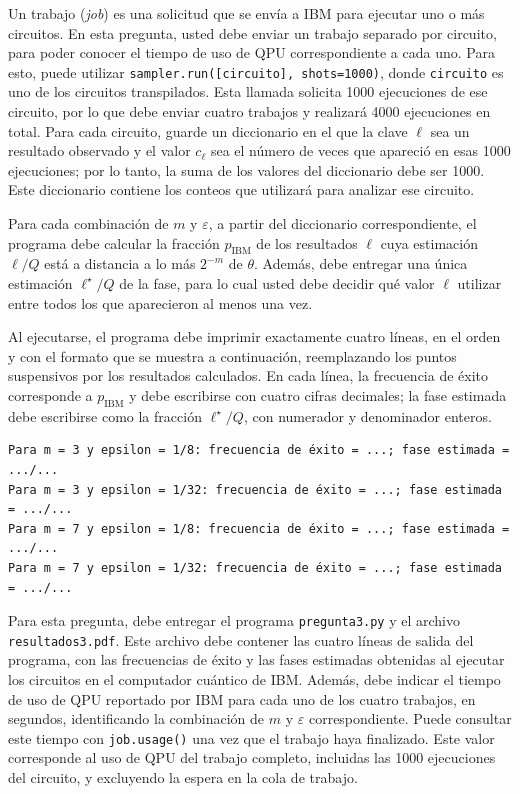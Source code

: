 \documentclass[10pt]{article}
\begin{document}
\begin{enumerate}
  Un trabajo (\emph{job}) es una solicitud que se envía a IBM para ejecutar uno o más
  circuitos. En esta pregunta, usted debe enviar un trabajo separado por circuito,
  para poder conocer el tiempo de uso de QPU correspondiente a cada uno. Para esto,
  puede utilizar \texttt{sampler.run([circuito], shots=1000)}, donde \texttt{circuito}
  es uno de los circuitos transpilados. Esta llamada solicita 1000 ejecuciones de ese
  circuito, por lo que debe enviar cuatro trabajos y realizará 4000 ejecuciones en total.
  Para cada circuito, guarde un diccionario en el que la clave $\ell$ sea un resultado
  observado y el valor $c_\ell$ sea el número de veces que apareció en esas 1000
  ejecuciones; por lo tanto, la suma de los valores del diccionario debe ser 1000.
  Este diccionario contiene los conteos que utilizará para analizar ese circuito.

  Para cada combinación de $m$ y $\varepsilon$, a partir del diccionario correspondiente,
  el programa debe calcular la fracción $p_{\mathrm{IBM}}$ de los resultados $\ell$
  cuya estimación $\ell/Q$ está a distancia a lo más $2^{-m}$ de $\theta$. Además,
  debe entregar una única estimación $\ell^\star/Q$ de la fase, para lo cual usted
  debe decidir qué valor $\ell$ utilizar entre todos los que aparecieron al menos una vez.

  Al ejecutarse, el programa debe imprimir exactamente cuatro líneas, en el orden y
  con el formato que se muestra a continuación, reemplazando los puntos suspensivos
  por los resultados calculados. En cada línea, la frecuencia de éxito corresponde
  a $p_{\mathrm{IBM}}$ y debe escribirse con cuatro cifras decimales; la fase estimada
  debe escribirse como la fracción $\ell^\star/Q$, con numerador y denominador enteros.

\begin{verbatim}
Para m = 3 y epsilon = 1/8: frecuencia de éxito = ...; fase estimada = .../...
Para m = 3 y epsilon = 1/32: frecuencia de éxito = ...; fase estimada = .../...
Para m = 7 y epsilon = 1/8: frecuencia de éxito = ...; fase estimada = .../...
Para m = 7 y epsilon = 1/32: frecuencia de éxito = ...; fase estimada = .../...
\end{verbatim}

  Para esta pregunta, debe entregar el programa \texttt{pregunta3.py} y el archivo
  \texttt{resultados3.pdf}. Este archivo debe contener las cuatro líneas de salida
  del programa, con las frecuencias de éxito y las fases estimadas obtenidas al
  ejecutar los circuitos en el computador cuántico de IBM. Además, debe indicar el
  tiempo de uso de QPU reportado por IBM para cada uno de los cuatro trabajos, en
  segundos, identificando la combinación de $m$ y $\varepsilon$ correspondiente. Puede consultar este tiempo con \texttt{job.usage()}
  una vez que el trabajo haya finalizado. Este valor corresponde al uso de QPU del
  trabajo completo, incluidas las 1000 ejecuciones del circuito, y excluyendo la espera en la cola de trabajo.
\end{enumerate}
\end{document}
